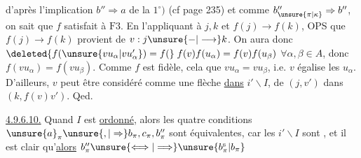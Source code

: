 d'après l'implication $b''\Rightarrow a$ de la  $1^\circ)$ (cf page 235) et comme $b''_{\unsure{\pi|\kappa}}\Rightarrow b''$, on sait   que $f$ satisfait à $\mathrm{F}3$.
En l'appliquant à $j,k$ et $f(j)\longrightarrow f(k)$, OPS que $f(j)\longrightarrow f(k)$ provient de $v:j\unsure{\mathbin{-}|\longrightarrow}k$. On aura donc $\deleted{f(\unsure{vu_{\alpha}|vu'_{\alpha}})=f(}\; f(v)f(u_{\alpha})=f(v)f(u_{\beta})$ $\forall\alpha,\beta\in A$, donc $f(vu_{\alpha})=f(vu_{\beta})$.
Comme $f$ est fidèle, cela  que $vu_{\alpha}=vu_{\beta}$, i.e. $v$ égalise les $u_{\alpha}$. D'ailleurs, $v$ peut être considéré comme une flèche \uline{dans} $i'\backslash I$, de $(j,v')$ dans $(k,f(v)v')$. Qed.

\uline{4.9.6.10.} Quand $I$ est \uline{ordonné}, alors les quatre conditions $\unsure{a}_{\pi}\unsure{,|\Rightarrow}b_{\pi},c_{\pi},b''_{\pi}$ sont équivalentes, car les $i'\backslash I$ sont , et il est clair qu'\uline{alors} $b''_{\pi}\unsure{\Longleftrightarrow|\Longrightarrow}\unsure{b^{\mathrm{s}}_{\pi}|b_{\pi}}$

